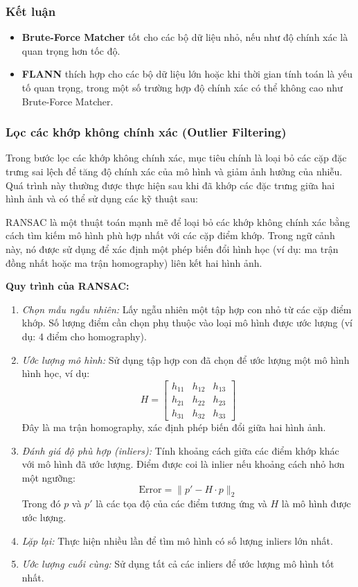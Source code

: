 \subsubsection*{Kết luận}
\begin{itemize}
	\item \textbf{Brute-Force Matcher} tốt cho các bộ dữ liệu nhỏ, nếu như độ chính xác là quan trọng hơn tốc độ.
	\item \textbf{FLANN} thích hợp cho các bộ dữ liệu lớn hoặc khi thời gian tính toán là yếu tố quan trọng, trong một số trường hợp độ chính xác có thể không cao như Brute-Force Matcher.
\end{itemize}

\subsubsection{Lọc các khớp không chính xác (Outlier Filtering)}

Trong bước lọc các khớp không chính xác, mục tiêu chính là loại bỏ các cặp đặc trưng sai lệch để tăng độ chính xác của mô hình và giảm ảnh hưởng của nhiễu. Quá trình này thường được thực hiện sau khi đã khớp các đặc trưng giữa hai hình ảnh và có thể sử dụng các kỹ thuật sau:

RANSAC là một thuật toán mạnh mẽ để loại bỏ các khớp không chính xác bằng cách tìm kiếm mô hình phù hợp nhất với các cặp điểm khớp. Trong ngữ cảnh này, nó được sử dụng để xác định một phép biến đổi hình học (ví dụ: ma trận đồng nhất hoặc ma trận homography) liên kết hai hình ảnh.

\textbf{Quy trình của RANSAC:}
\begin{enumerate}
	\item \textit{Chọn mẫu ngẫu nhiên:} Lấy ngẫu nhiên một tập hợp con nhỏ từ các cặp điểm khớp. Số lượng điểm cần chọn phụ thuộc vào loại mô hình được ước lượng (ví dụ: 4 điểm cho homography).
	\item \textit{Ước lượng mô hình:} Sử dụng tập hợp con đã chọn để ước lượng một mô hình hình học, ví dụ:
	\[
	H = 
	\begin{bmatrix}
		h_{11} & h_{12} & h_{13} \\
		h_{21} & h_{22} & h_{23} \\
		h_{31} & h_{32} & h_{33}
	\end{bmatrix}
	\]
	Đây là ma trận homography, xác định phép biến đổi giữa hai hình ảnh.
	\item \textit{Đánh giá độ phù hợp (inliers):} Tính khoảng cách giữa các điểm khớp khác với mô hình đã ước lượng. Điểm được coi là inlier nếu khoảng cách nhỏ hơn một ngưỡng:
	\[
	\text{Error} = \| p' - H \cdot p \|_2
	\]
	Trong đó \(p\) và \(p'\) là các tọa độ của các điểm tương ứng và \(H\) là mô hình được ước lượng.
	\item \textit{Lặp lại:} Thực hiện nhiều lần để tìm mô hình có số lượng inliers lớn nhất.
	\item \textit{Ước lượng cuối cùng:} Sử dụng tất cả các inliers để ước lượng mô hình tốt nhất.
\end{enumerate}

